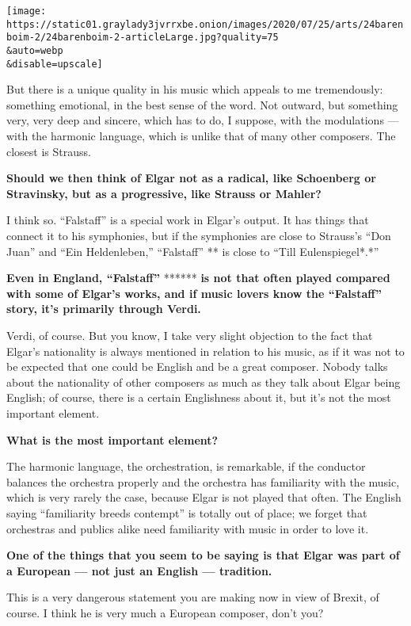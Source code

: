 \texttt{[image: https://static01.graylady3jvrrxbe.onion/images/2020/07/25/arts/24barenboim-2/24barenboim-2-articleLarge.jpg?quality=75\\\&auto=webp\\\&disable=upscale]}

But there is a unique quality in his music which appeals to me
tremendously: something emotional, in the best sense of the word. Not
outward, but something very, very deep and sincere, which has to do, I
suppose, with the modulations --- with the harmonic language, which is
unlike that of many other composers. The closest is Strauss.

\textbf{Should we then think of Elgar not as a radical, like Schoenberg
or Stravinsky, but as a progressive, like Strauss or Mahler?}

I think so. ``Falstaff'' is a special work in Elgar's output. It has
things that connect it to his symphonies, but if the symphonies are
close to Strauss's ``Don Juan'' and ``Ein Heldenleben,'' ``Falstaff'' **
is close to ``Till Eulenspiegel*.*''

\textbf{Even in England, ``Falstaff''} ****** \textbf{is not that often
played compared with some of Elgar's works, and if music lovers know the
``Falstaff'' story, it's primarily through Verdi.}

Verdi, of course. But you know, I take very slight objection to the fact
that Elgar's nationality is always mentioned in relation to his music,
as if it was not to be expected that one could be English and be a great
composer. Nobody talks about the nationality of other composers as much
as they talk about Elgar being English; of course, there is a certain
Englishness about it, but it's not the most important element.

\textbf{What is the most important element?}

The harmonic language, the orchestration, is remarkable, if the
conductor balances the orchestra properly and the orchestra has
familiarity with the music, which is very rarely the case, because Elgar
is not played that often. The English saying ``familiarity breeds
contempt'' is totally out of place; we forget that orchestras and
publics alike need familiarity with music in order to love it.

\textbf{One of the things that you seem to be saying is that Elgar was
part of a European --- not just an English --- tradition.}

This is a very dangerous statement you are making now in view of Brexit,
of course. I think he is very much a European composer, don't you?

